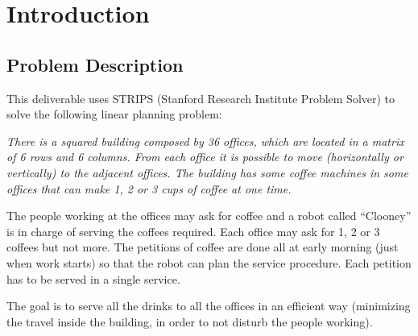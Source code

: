\section{Introduction}

\subsection{Problem Description}

This deliverable uses STRIPS (Stanford Research Institute Problem Solver) to solve the following linear planning problem:

\begin{displayquote}
\itshape
There is a squared building composed by 36 offices, which are located in a matrix of 6 rows and 6 columns. From each office it is possible to move (horizontally or vertically) to the adjacent offices. The building has some coffee machines in some offices that can make 1, 2 or 3 cups of coffee at one time. 	

The people working at the offices may ask for coffee and a robot called “Clooney” is in charge of serving the coffees required. Each office may ask for 1, 2 or 3 coffees but not more. The petitions of coffee are done all at early morning (just when work starts) so that the robot can plan the service procedure. Each petition has to be served in a single service.

The goal is to serve all the drinks to all the offices in an efficient way (minimizing the travel inside the building, in order to not disturb the people working).
\end{displayquote}

